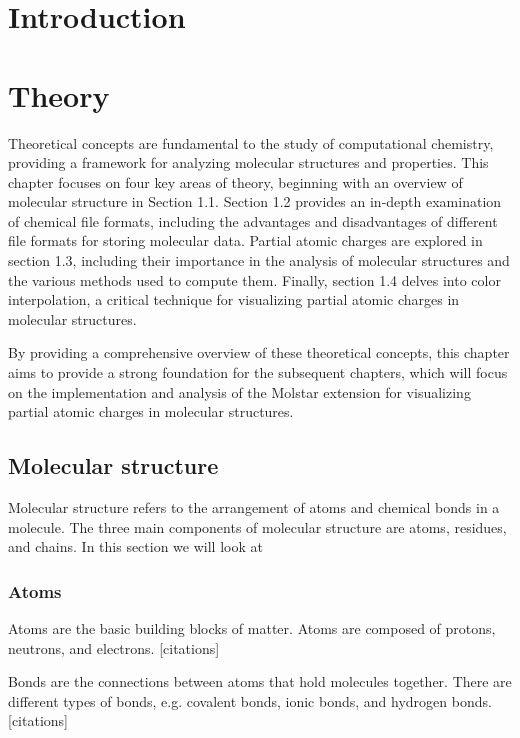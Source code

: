 \documentclass[
  digital,     %
  oneside,     %
  nosansbold,  %
  nocolorbold, %
  lof,         %
  lot,         %
]{fithesis4}
\begin{document}

\chapter*{Introduction}


\chapter{Theory}

Theoretical concepts are fundamental to the study of computational chemistry, providing a framework for analyzing molecular structures and properties. This chapter focuses on four key areas of theory, beginning with an overview of molecular structure in Section 1.1. Section 1.2 provides an in-depth examination of chemical file formats, including the advantages and disadvantages of different file formats for storing molecular data. Partial atomic charges are explored in section 1.3, including their importance in the analysis of molecular structures and the various methods used to compute them. Finally, section 1.4 delves into color interpolation, a critical technique for visualizing partial atomic charges in molecular structures.

By providing a comprehensive overview of these theoretical concepts, this chapter aims to provide a strong foundation for the subsequent chapters, which will focus on the implementation and analysis of the Molstar extension for visualizing partial atomic charges in molecular structures.

\section{Molecular structure}

Molecular structure refers to the arrangement of atoms and chemical bonds in a molecule. The three main components of molecular structure are atoms, residues, and chains.
In this section we will look at

\subsection{Atoms}
Atoms are the basic building blocks of matter. Atoms are composed of protons, neutrons, and electrons. [citations]

Bonds are the connections between atoms that hold molecules together. There are different types of bonds, e.g. covalent bonds, ionic bonds, and hydrogen bonds. [citations]
\end{document}
